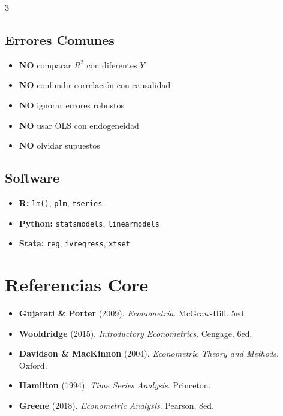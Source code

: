 \documentclass[9pt, spanish, twoside]{article}
\newcommand{\critical}[1]{\textcolor{CriticalRed}{\textbf{#1}}}
\begin{document}
\begin{multicols*}{3}
\subsection{Errores Comunes}
\begin{itemize}[leftmargin=8pt, noitemsep, topsep=2pt]
    \item \critical{NO} comparar $R^2$ con diferentes $Y$
    \item \critical{NO} confundir correlación con causalidad
    \item \critical{NO} ignorar errores robustos
    \item \critical{NO} usar OLS con endogeneidad
    \item \critical{NO} olvidar supuestos
\end{itemize}

\subsection{Software}
\begin{itemize}[leftmargin=8pt, noitemsep, topsep=2pt]
    \item \textbf{R:} \texttt{lm()}, \texttt{plm}, \texttt{tseries}
    \item \textbf{Python:} \texttt{statsmodels}, \texttt{linearmodels}
    \item \textbf{Stata:} \texttt{reg}, \texttt{ivregress}, \texttt{xtset}
\end{itemize}

\section{Referencias Core}
\begin{itemize}[leftmargin=8pt, noitemsep, topsep=2pt]
    \item \textbf{Gujarati \& Porter} (2009). \textit{Econometría}. McGraw-Hill. 5ed.
    \item \textbf{Wooldridge} (2015). \textit{Introductory Econometrics}. Cengage. 6ed.
    \item \textbf{Davidson \& MacKinnon} (2004). \textit{Econometric Theory and Methods}. Oxford.
    \item \textbf{Hamilton} (1994). \textit{Time Series Analysis}. Princeton.
    \item \textbf{Greene} (2018). \textit{Econometric Analysis}. Pearson. 8ed.
\end{itemize}

\end{multicols*}
\end{document}
